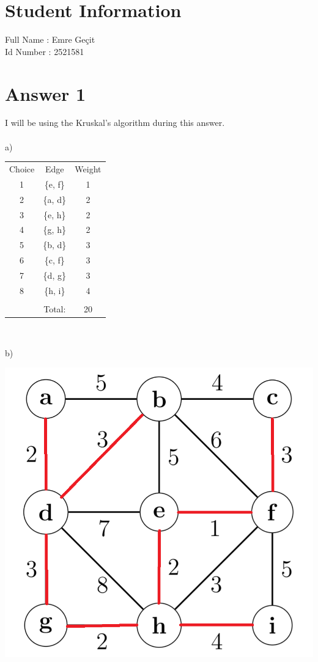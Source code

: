 \documentclass[12pt]{article}
\begin{document}
\section*{Student Information } 
Full Name : Emre Geçit \\
Id Number : 2521581 \\

\section*{Answer 1}
I will be using the Kruskal's algorithm during this answer.\\\\
a)
\begin{center}

\begin{tabular}{ c c c }
 Choice & Edge & Weight \\ 
 1 & \{e, f\} & 1 \\  
 2 & \{a, d\} & 2 \\
 3 & \{e, h\} & 2 \\
 4 & \{g, h\} & 2 \\
 5 & \{b, d\} & 3 \\
 6 & \{c, f\} & 3 \\
 7 & \{d, g\} & 3 \\
 8 & \{h, i\} & 4 \\
   &          &   \\
   & Total:   & 20
\end{tabular}\
\end{center}
b)
\begin{center}
\includegraphics[scale=0.35]{spanningtree.png}\\
\end{center}
\end{document}
